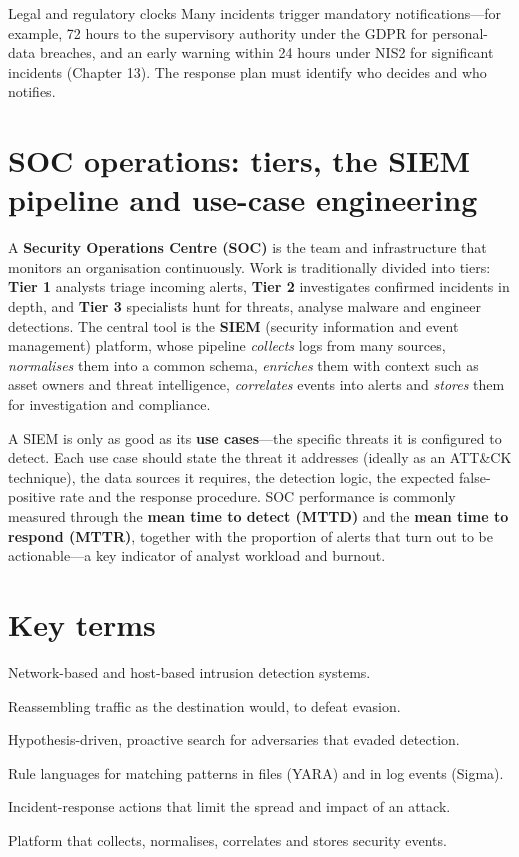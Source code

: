 \begin{notebox}{Legal and regulatory clocks}
Many incidents trigger mandatory notifications—for example, 72 hours to the supervisory authority under the GDPR for personal-data breaches, and an early warning within 24 hours under NIS2 for significant incidents (Chapter 13). The response plan must identify who decides and who notifies.
\end{notebox}

\section{SOC operations: tiers, the SIEM pipeline and use-case engineering}\label{sec:11.7}
A \textbf{Security Operations Centre (SOC)} is the team and infrastructure that monitors an organisation continuously. Work is traditionally divided into tiers: \textbf{Tier 1} analysts triage incoming alerts, \textbf{Tier 2} investigates confirmed incidents in depth, and \textbf{Tier 3} specialists hunt for threats, analyse malware and engineer detections. The central tool is the \textbf{SIEM} (security information and event management) platform, whose pipeline \emph{collects} logs from many sources, \emph{normalises} them into a common schema, \emph{enriches} them with context such as asset owners and threat intelligence, \emph{correlates} events into alerts and \emph{stores} them for investigation and compliance.

A SIEM is only as good as its \textbf{use cases}—the specific threats it is configured to detect. Each use case should state the threat it addresses (ideally as an ATT\&CK technique), the data sources it requires, the detection logic, the expected false-positive rate and the response procedure. SOC performance is commonly measured through the \textbf{mean time to detect (MTTD)} and the \textbf{mean time to respond (MTTR)}, together with the proportion of alerts that turn out to be actionable—a key indicator of analyst workload and burnout.

\section*{Key terms}
\begin{description}[style=nextline,leftmargin=1.2em]
  \item[NIDS / HIDS] Network-based and host-based intrusion detection systems.
  \item[Traffic normalisation] Reassembling traffic as the destination would, to defeat evasion.
  \item[Threat hunting] Hypothesis-driven, proactive search for adversaries that evaded detection.
  \item[YARA / Sigma] Rule languages for matching patterns in files (YARA) and in log events (Sigma).
  \item[Containment] Incident-response actions that limit the spread and impact of an attack.
  \item[SIEM] Platform that collects, normalises, correlates and stores security events.
\end{description}

